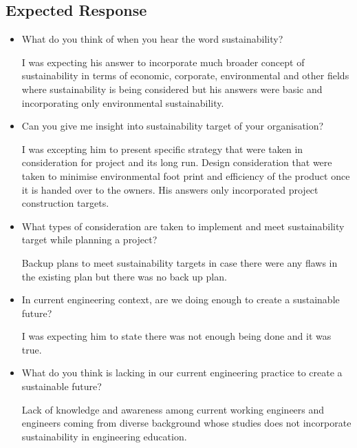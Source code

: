 \documentclass{article}
\begin{document}
\subsection{Expected Response}\label{sec:EXPECTED}
\begin{itemize}
\item What do you think of when you hear the word sustainability?


I was expecting his answer to incorporate much broader concept of sustainability in terms of economic, corporate, environmental and other fields where sustainability is being considered but his answers were basic and incorporating only environmental sustainability.
\item Can you give me insight into sustainability target of your organisation?


I was excepting him to present specific strategy that were taken in consideration for project and its long run. Design consideration that were taken to minimise environmental foot print and efficiency of the product once it is handed over to the owners. His answers only incorporated project construction targets.
\item What types of consideration are taken to implement and meet sustainability target while planning a project?


Backup plans to meet sustainability targets in case there were any flaws in the existing plan but there was no back up plan. 
\item In current engineering context, are we doing enough to create a sustainable future?


I was expecting him to state there was not enough being done and it was true.

\item What do you think is lacking in our current engineering practice to create a sustainable future?


Lack of knowledge and awareness among current working engineers and engineers coming from diverse background whose studies does not incorporate sustainability in engineering education.
\end{itemize}
\end{document}
